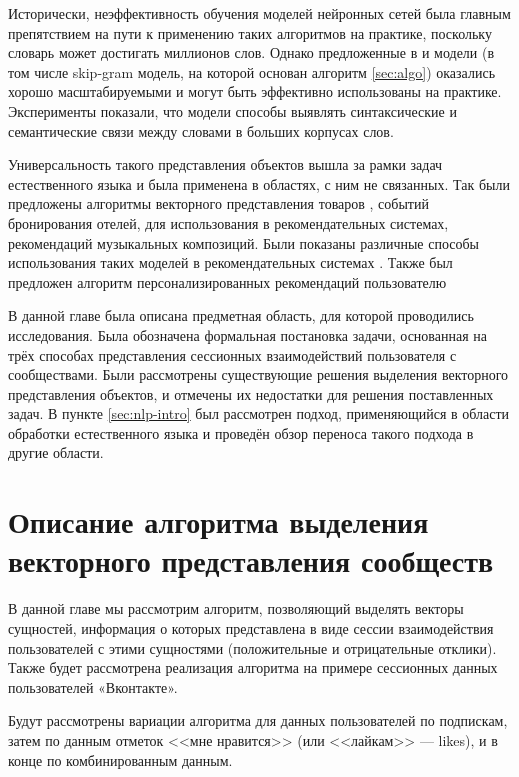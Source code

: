 \documentclass[times,specification,annotation]{itmo-student-thesis}
\begin{document}
Исторически, неэффективность обучения моделей нейронных сетей была главным препятствием на пути к применению таких алгоритмов на практике, поскольку словарь может достигать миллионов слов. Однако предложенные в \cite{mikolov2013efficient} и \cite{mikolov2013distributed} модели (в том числе skip-gram модель, на которой основан алгоритм \ref{sec:algo}) оказались хорошо масштабируемыми и могут быть эффективно использованы на практике. Эксперименты показали, что модели способы выявлять синтаксические и семантические связи между словами в больших корпусах слов. 

Универсальность такого представления объектов вышла за рамки задач естественного языка и была применена в областях, с ним не связанных. Так были предложены алгоритмы векторного представления товаров \cite{grbovic2015commerce}\cite{Vasile2016}, событий бронирования отелей\cite{airbnb}, для использования в рекомендательных системах, рекомендаций музыкальных композиций\cite{cheng2017exploiting}. Были показаны различные способы использования таких моделей в рекомендательных системах \cite{ozsoy2016word}. Также был предложен алгоритм персонализированных рекомендаций пользователю \cite{manotumruksa2016modelling}

\chapterconclusion

В данной главе была описана предметная область, для которой проводились исследования. Была обозначена формальная постановка задачи, основанная на трёх способах представления сессионных взаимодействий пользователя с сообществами. Были рассмотрены существующие решения выделения векторного представления объектов, и отмечены их недостатки для решения поставленных задач. В пункте \ref{sec:nlp-intro} был рассмотрен подход, применяющийся в области обработки естественного языка и проведён обзор переноса такого подхода в другие области.   

\finishrelatedwork

\chapter{Описание алгоритма выделения векторного представления сообществ}

В данной главе мы рассмотрим алгоритм, позволяющий выделять векторы
сущностей, информация о которых представлена в виде сессии взаимодействия
пользователей с этими сущностями (положительные и отрицательные отклики).
Также будет рассмотрена реализация алгоритма на примере сессионных данных
пользователей «Вконтакте». 

Будут рассмотрены вариации алгоритма для данных пользователей по подпискам, затем по данным отметок <<мне нравится>> (или <<лайкам>> --- likes), и в конце по комбинированным данным.
\end{document}

